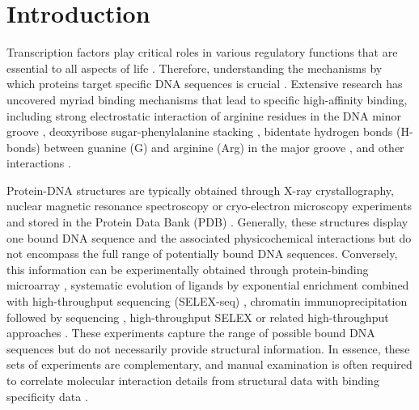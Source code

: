 \section{Introduction} 

Transcription factors play critical roles in various regulatory functions that are essential to all aspects of life \citep{Spitz2012}. Therefore, understanding the mechanisms by which proteins target specific DNA sequences is crucial \citep{Zhao2009}. Extensive research has uncovered myriad binding mechanisms that lead to specific high-affinity binding, including strong electrostatic interaction of arginine residues in the DNA minor groove \citep{rohs2009role}, deoxyribose sugar-phenylalanine stacking \citep{stirnimann2010structural}, bidentate hydrogen bonds (H-bonds) between guanine (G) and arginine (Arg) in the major groove \citep{Helene1977}, and other interactions \citep{Rohs2010,Schildbach1999,Seeman1976}.
\par
Protein-DNA structures are typically \citep{Garvie2001} obtained through X-ray crystallography, nuclear magnetic resonance spectroscopy or cryo-electron microscopy experiments and stored in the Protein Data Bank (PDB) \citep{berman2000protein}. Generally, these structures display one bound DNA sequence and the associated physicochemical interactions \citep{Rohs2010} but do not encompass the full range of potentially bound DNA sequences. Conversely, this information can be experimentally obtained through protein-binding microarray \citep{Berger2009}, systematic evolution of ligands by exponential enrichment combined with high-throughput sequencing (SELEX-seq) \citep{Slattery2011}, chromatin immunoprecipitation followed by sequencing \citep{Park2009}, high-throughput SELEX \citep{Jolma2013} or related high-throughput approaches \citep{Slattery2014}. These experiments capture the range of possible bound DNA sequences but do not necessarily provide structural information. In essence, these sets of experiments are complementary, and manual examination is often required to correlate molecular interaction details from structural data with binding specificity data \citep{rohs2009role}.
\par
